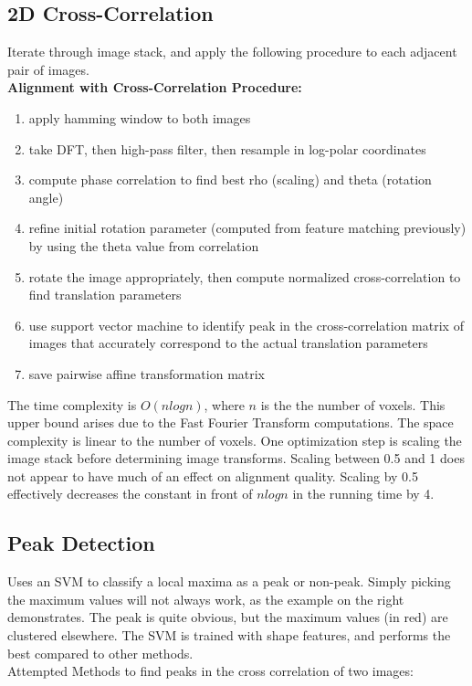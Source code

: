 \documentclass{article}
\begin{document}
\subsection{2D Cross-Correlation}
Iterate through image stack, and apply the following procedure to each adjacent pair of images. \\
\textbf{Alignment with Cross-Correlation Procedure:}
\begin{enumerate}
\item apply hamming window to both images
\item take DFT, then high-pass filter, then resample in log-polar coordinates
\item compute phase correlation to find best rho (scaling) and theta (rotation angle)
\item refine initial rotation parameter (computed from feature matching previously) by using the theta value from correlation
\item rotate the image appropriately, then compute normalized cross-correlation to find translation parameters
\item use support vector machine to identify peak in the cross-correlation matrix of images that accurately correspond to the actual translation parameters
\item save pairwise affine transformation matrix
\end{enumerate}

The time complexity is $O(nlogn)$, where $n$ is the the number of voxels. This upper bound arises due to the Fast Fourier Transform computations. The space complexity is linear to the number of voxels. One optimization step is scaling the image stack before determining image transforms. Scaling between 0.5 and 1 does not appear to have much of an effect on alignment quality. Scaling by 0.5 effectively decreases the constant in front of $nlogn$ in the running time by 4. \\

\subsection{Peak Detection}

Uses an SVM to classify a local maxima as a peak or non-peak. 
Simply picking the maximum values will not always work, as the example on the right demonstrates. The peak is quite obvious, but the maximum values (in red) are clustered elsewhere. The SVM is trained with shape features, and performs the best compared to other methods.\\
Attempted Methods to find peaks in the cross correlation of two images:
\end{document}
